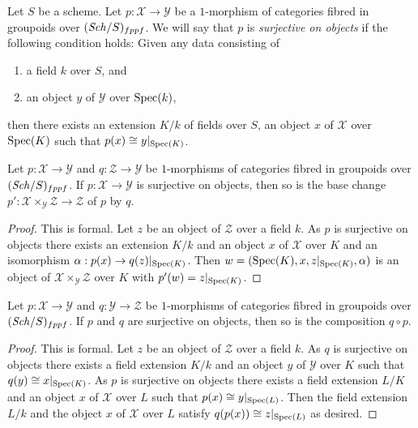 \noindent
Let $S$ be a scheme. Let $p : \mathcal{X} \to \mathcal{Y}$ be a $1$-morphism
of categories fibred in groupoids over $(\mathit{Sch}/S)_{fppf}$. We will say that
$p$ is {\it surjective on objects} if the following condition holds:
Given any data consisting of
\begin{enumerate}
\item a field $k$ over $S$, and
\item an object $y$ of $\mathcal{Y}$ over $\mathop{\mathrm{Spec}}(k)$,
\end{enumerate}
then there exists an extension $K/k$ of fields over $S$, an
object $x$ of $\mathcal{X}$ over $\mathop{\mathrm{Spec}}(K)$
such that $p(x) \cong y|_{\mathop{\mathrm{Spec}}(K)}$.

\begin{lemma}
\label{lemma-base-change-surjective}
Let $p : \mathcal{X} \to \mathcal{Y}$ and $q : \mathcal{Z} \to \mathcal{Y}$
be $1$-morphisms of categories fibred in groupoids over $(\mathit{Sch}/S)_{fppf}$.
If $p : \mathcal{X} \to \mathcal{Y}$ is surjective on objects, then so
is the base change
$p' : \mathcal{X} \times_\mathcal{Y} \mathcal{Z} \to \mathcal{Z}$
of $p$ by $q$.
\end{lemma}

\begin{proof}
This is formal. Let $z$ be an object of $\mathcal{Z}$ over a field $k$.
As $p$ is surjective on objects there exists an extension $K/k$
and an object $x$ of $\mathcal{X}$ over $K$ and an isomorphism
$\alpha : p(x) \to q(z)|_{\mathop{\mathrm{Spec}}(K)}$. Then
$w = (\mathop{\mathrm{Spec}}(K), x, z|_{\mathop{\mathrm{Spec}}(K)}, \alpha)$ is an object of
$\mathcal{X} \times_\mathcal{Y} \mathcal{Z}$ over $K$ with
$p'(w) = z|_{\mathop{\mathrm{Spec}}(K)}$.
\end{proof}

\begin{lemma}
\label{lemma-composition-surjective}
Let $p : \mathcal{X} \to \mathcal{Y}$ and $q : \mathcal{Y} \to \mathcal{Z}$
be $1$-morphisms of categories fibred in groupoids over $(\mathit{Sch}/S)_{fppf}$.
If $p$ and $q$ are surjective on objects, then so is the composition
$q \circ p$.
\end{lemma}

\begin{proof}
This is formal. Let $z$ be an object of $\mathcal{Z}$ over a field $k$.
As $q$ is surjective on objects there exists a field extension $K/k$
and an object $y$ of $\mathcal{Y}$ over $K$ such that
$q(y) \cong x|_{\mathop{\mathrm{Spec}}(K)}$. As $p$ is surjective on objects there
exists a field extension $L/K$ and an object $x$ of $\mathcal{X}$
over $L$ such that $p(x) \cong y|_{\mathop{\mathrm{Spec}}(L)}$. Then the field extension
$L/k$ and the object $x$ of $\mathcal{X}$ over $L$ satisfy
$q(p(x)) \cong z|_{\mathop{\mathrm{Spec}}(L)}$ as desired.
\end{proof}

